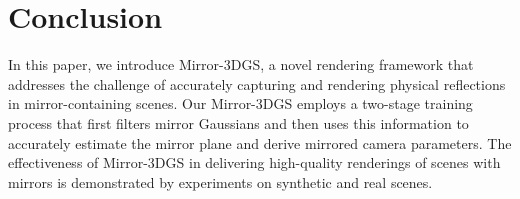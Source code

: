\documentclass[conference]{IEEEtran}
\begin{document}
\section{Conclusion}
In this paper, we introduce Mirror-3DGS, a novel rendering framework that addresses the challenge of accurately capturing and rendering physical reflections in mirror-containing scenes. Our Mirror-3DGS employs a two-stage training process that first filters mirror Gaussians and then uses this information to accurately estimate the mirror plane and derive mirrored camera parameters. The effectiveness of Mirror-3DGS in delivering high-quality renderings of scenes with mirrors is demonstrated by experiments on 
 synthetic and real scenes. 
 




\end{document}
